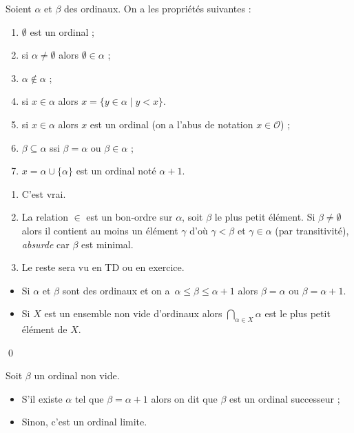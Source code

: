 \documentclass[./main]{subfiles}
\begin{document}
  \begin{prop}
    Soient $\alpha$  et $\beta$ des ordinaux. On a les propriétés suivantes :
    \begin{enumerate}
      \item $\emptyset$ est un ordinal ;
      \item si $\alpha \neq \emptyset$ alors $\emptyset \in \alpha$ ;
      \item $\alpha \not \in \alpha$ ;
      \item si $x \in \alpha$ alors $x = \{y \in \alpha  \mid y < x\}$.
      \item si $x \in \alpha$ alors $x$ est un ordinal (on a l'abus de notation $x \in \mathcal{O}$) ;
      \item $\beta \subseteq \alpha$ ssi $\beta = \alpha$ ou  $\beta \in \alpha$ ;
      \item $x = \alpha \cup \{\alpha\}$ est un ordinal noté $\alpha + 1$.
    \end{enumerate}
  \end{prop}

  \begin{prv}
    \begin{enumerate}
      \item C'est vrai.
      \item La relation $\in$ est un bon-ordre sur $\alpha$, soit $\beta$ le plus petit élément.
        Si $\beta \neq \emptyset$ alors il contient au moins un élément $\gamma$ d'où $\gamma < \beta$ et $\gamma \in \alpha$ (par transitivité), \textit{absurde} car $\beta$ est minimal.
      \item Le reste sera vu en TD ou en exercice.
    \end{enumerate}
  \end{prv}

  \begin{prop}
    \begin{itemize}
      \item Si $\alpha$ et $\beta$ sont des ordinaux et on a~$\alpha \le \beta \le \alpha + 1$ alors $\beta = \alpha$ ou  $\beta = \alpha + 1$.
      \item Si $X$ est un ensemble non vide d'ordinaux alors $\bigcap_{\alpha \in X} \alpha$ est le plus petit élément de $X$.
    \end{itemize}
    \qed
  \end{prop}

  \begin{defn}
    Soit $\beta$ un ordinal non vide.
    \begin{itemize}
      \item S'il existe $\alpha$ tel que $\beta = \alpha + 1$ alors on dit que $\beta$ est un ordinal successeur ;
      \item Sinon, c'est un ordinal limite.
    \end{itemize}
  \end{defn}
\end{document}
